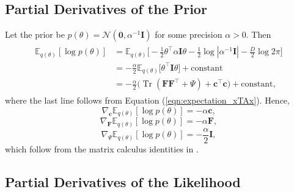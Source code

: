 \documentclass[msc,deptreport.inf]{infthesis} %
\newcommand{\matr}[1]{\mathbf{#1}}
\newcommand{\E}{\mathbb E}
\newcommand{\tr}{\mathop{\mathrm{Tr}}}
\begin{document}
\subsection{Partial Derivatives of the Prior}

Let the prior be $p(\theta) = \mathcal{N}(\matr{0}, \alpha^{-1} \matr{I})$ for some precision $\alpha > 0$. Then
\begin{align}
\begin{split}
	\E_{q(\theta)} [\log p(\theta)]
	& = \E_{q(\theta)} \Big[-\frac{1}{2} \theta^\intercal \alpha \matr{I} \theta  - \frac{1}{2} \log |\alpha^{-1} \matr{I}| - \frac{D}{2} \log 2\pi\Big] \\
	& = -\frac{\alpha}{2} \E_{q(\theta)} \Big[ \theta^\intercal \matr{I} \theta \Big] + \text{constant} \\
	& = -\frac{\alpha}{2}\big( \tr(\matr{FF}^{\intercal} + \Psi) + \matr{c}^\intercal \matr{c} \big)+ \text{constant},
\end{split}
\end{align}
where the last line follows from Equation (\ref{eqn:expectation_xTAx}). Hence, 
\begin{equation}
	\nabla_\matr{c} \E_{q(\theta)} [\log p(\theta)] = -\alpha \matr{c},
\end{equation}
\begin{equation}
	\nabla_\matr{F} \E_{q(\theta)} [\log p(\theta)] = -\alpha \matr{F},
\end{equation}
\begin{equation}\label{eqn:grad_prior_wrt_psi}
	\nabla_\Psi \E_{q(\theta)} [\log p(\theta)] = -\frac{\alpha}{2} \matr{I},
\end{equation}
which follow from the matrix calculus identities in \cite{petersen2012}.

\subsection{Partial Derivatives of the Likelihood}
\end{document}
